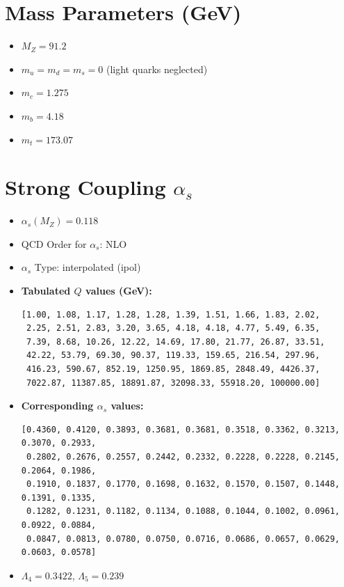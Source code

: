 \documentclass[a4paper,11pt]{article}
\begin{document}
\section*{Mass Parameters (GeV)}
\begin{itemize}
    \item $M_Z = 91.2$
    \item $m_u = m_d = m_s = 0$ (light quarks neglected)
    \item $m_c = 1.275$
    \item $m_b = 4.18$
    \item $m_t = 173.07$
\end{itemize}

\section*{Strong Coupling $\alpha_s$}
\begin{itemize}
    \item $\alpha_s(M_Z) = 0.118$
    \item QCD Order for $\alpha_s$: NLO
    \item $\alpha_s$ Type: interpolated (ipol)
    \item \textbf{Tabulated $Q$ values (GeV):}
    
    \small
    \begin{verbatim}
[1.00, 1.08, 1.17, 1.28, 1.28, 1.39, 1.51, 1.66, 1.83, 2.02,
 2.25, 2.51, 2.83, 3.20, 3.65, 4.18, 4.18, 4.77, 5.49, 6.35,
 7.39, 8.68, 10.26, 12.22, 14.69, 17.80, 21.77, 26.87, 33.51,
 42.22, 53.79, 69.30, 90.37, 119.33, 159.65, 216.54, 297.96,
 416.23, 590.67, 852.19, 1250.95, 1869.85, 2848.49, 4426.37,
 7022.87, 11387.85, 18891.87, 32098.33, 55918.20, 100000.00]
    \end{verbatim}
    \normalsize

    \item \textbf{Corresponding $\alpha_s$ values:}
    
    \small
    \begin{verbatim}
[0.4360, 0.4120, 0.3893, 0.3681, 0.3681, 0.3518, 0.3362, 0.3213, 0.3070, 0.2933,
 0.2802, 0.2676, 0.2557, 0.2442, 0.2332, 0.2228, 0.2228, 0.2145, 0.2064, 0.1986,
 0.1910, 0.1837, 0.1770, 0.1698, 0.1632, 0.1570, 0.1507, 0.1448, 0.1391, 0.1335,
 0.1282, 0.1231, 0.1182, 0.1134, 0.1088, 0.1044, 0.1002, 0.0961, 0.0922, 0.0884,
 0.0847, 0.0813, 0.0780, 0.0750, 0.0716, 0.0686, 0.0657, 0.0629, 0.0603, 0.0578]
    \end{verbatim}
    \normalsize

    \item $\Lambda_4 = 0.3422$, \quad $\Lambda_5 = 0.239$
\end{itemize}
\end{document}
